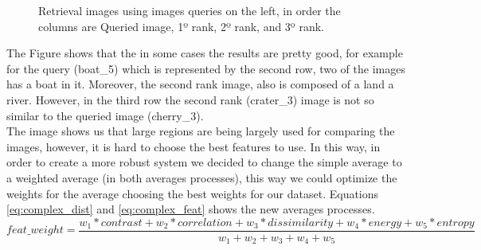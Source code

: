 \documentclass[12pt,a4paper]{article}
\begin{document}
\begin{figure}[!h]
{{		}
	}
	\enskip
	{
		{
			\setlength{\fboxsep}{1pt}
			\setlength{\fboxrule}{1pt}
		}
	}
	
		
	\caption{Retrieval images using images queries on the left, in order the columns are Queried image, 1º rank, 2º rank, and 3º rank.}
	\label{fig:simpleAvr}
\end{figure}

The Figure shows that the in some cases the results are pretty good, for example for the query (boat\_5) which is represented by the second row, two of the images has a boat in it. Moreover, the second rank image, also is composed of a land a river. However, in the third row the second rank (crater\_3) image is not so similar to the queried image (cherry\_3). \\ 

The image shows us that large regions are being largely used for comparing the images, however, it is hard to choose the best features to use. In this way, in order to create a more robust system we decided to change the simple average to a weighted average (in both averages processes), this way we could optimize the weights for the average choosing the best weights for our dataset. Equations \ref{eq:complex_dist} and \ref{eq:complex_feat} shows the new averages processes. \\

\begin{equation}
feat\_weight =  \frac{w_1 * contrast + w_2 * correlation + w_3 * dissimilarity + w_4 *  energy + w_5 * entropy}{w_1 + w_2 + w_3 + w_4 + w_5}
\label{eq:complex_dist}
\end{equation}
\end{document}
